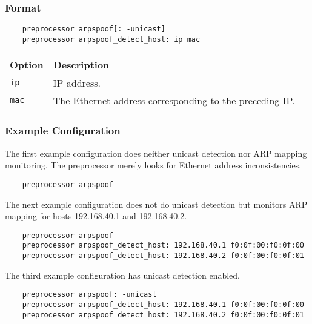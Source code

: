 \documentclass[english]{report}
\begin{document}
\subsubsection{Format}

\begin{verbatim}
    preprocessor arpspoof[: -unicast]
    preprocessor arpspoof_detect_host: ip mac                   
\end{verbatim}

\begin{table}[h]
\begin{center}
\begin{tabular}{| l | l |}

\hline 
\textbf{Option} & \textbf{Description}\\
\hline

\hline
\texttt{ip} & IP address.\\

\hline 
\texttt{mac} & The Ethernet address corresponding to the preceding IP. \\
\hline

\end{tabular}
\end{center}
\end{table}

\subsubsection{Example Configuration}

The first example configuration does neither unicast detection nor ARP mapping
monitoring. The preprocessor merely looks for Ethernet address inconsistencies.

\begin{verbatim}
    preprocessor arpspoof
\end{verbatim}

The next example configuration does not do unicast detection but monitors ARP
mapping for hosts 192.168.40.1 and 192.168.40.2.

\begin{verbatim}
    preprocessor arpspoof
    preprocessor arpspoof_detect_host: 192.168.40.1 f0:0f:00:f0:0f:00
    preprocessor arpspoof_detect_host: 192.168.40.2 f0:0f:00:f0:0f:01
\end{verbatim}

The third example configuration has unicast detection enabled.

\begin{verbatim}
    preprocessor arpspoof: -unicast
    preprocessor arpspoof_detect_host: 192.168.40.1 f0:0f:00:f0:0f:00
    preprocessor arpspoof_detect_host: 192.168.40.2 f0:0f:00:f0:0f:01
\end{verbatim}
\end{document}
